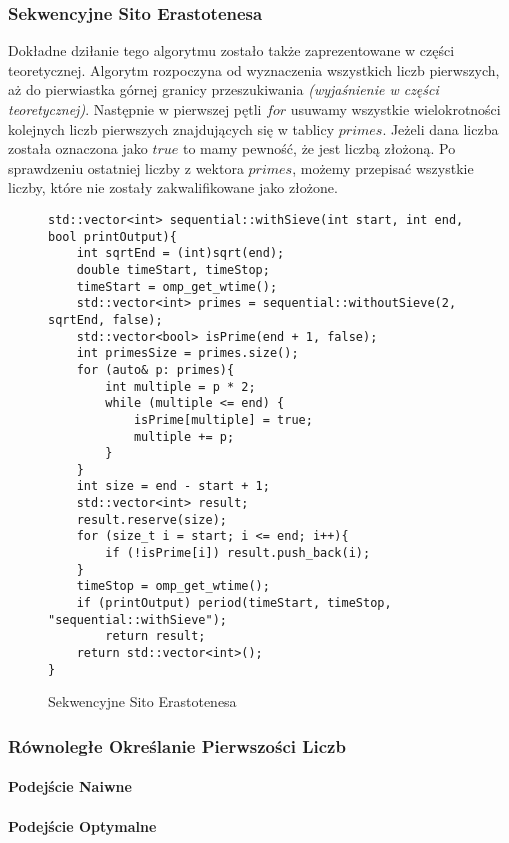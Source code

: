 \documentclass{article}
\begin{document}
            \subsubsection{Sekwencyjne Sito Erastotenesa}
                Dokładne dziłanie tego algorytmu zostało także zaprezentowane w części teoretycznej. Algorytm rozpoczyna od wyznaczenia wszystkich liczb pierwszych, aż do pierwiastka górnej granicy przeszukiwania \emph{(wyjaśnienie w części teoretycznej)}. Następnie w pierwszej pętli $for$ usuwamy wszystkie wielokrotności kolejnych liczb pierwszych znajdujących się w tablicy $primes$. Jeżeli dana liczba została oznaczona jako $true$ to mamy pewność, że jest liczbą złożoną. Po sprawdzeniu ostatniej liczby z wektora $primes$, możemy przepisać wszystkie liczby, które nie zostały zakwalifikowane jako złożone.
                \begin{figure}
                    \begin{verbatim}
std::vector<int> sequential::withSieve(int start, int end, bool printOutput){
    int sqrtEnd = (int)sqrt(end);
    double timeStart, timeStop;
    timeStart = omp_get_wtime();
    std::vector<int> primes = sequential::withoutSieve(2, sqrtEnd, false);
    std::vector<bool> isPrime(end + 1, false);
    int primesSize = primes.size();
    for (auto& p: primes){
        int multiple = p * 2;
        while (multiple <= end) {
            isPrime[multiple] = true;
            multiple += p;
        }
    }
    int size = end - start + 1;
    std::vector<int> result;
    result.reserve(size);
    for (size_t i = start; i <= end; i++){
        if (!isPrime[i]) result.push_back(i);
    }
    timeStop = omp_get_wtime();
    if (printOutput) period(timeStart, timeStop, "sequential::withSieve");
        return result;
    return std::vector<int>();
}
                    \end{verbatim}
                    \caption{Sekwencyjne Sito Erastotenesa}
                \end{figure}
                
            \subsubsection{Równoległe Określanie Pierwszości Liczb}
                \paragraph{Podejście Naiwne}
                \paragraph{Podejście Optymalne}
\end{document}
